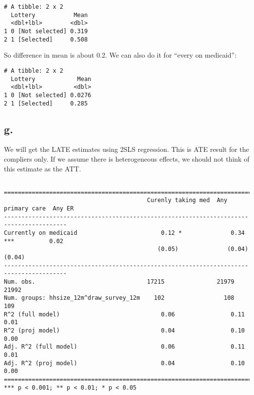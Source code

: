 \documentclass[
  letterpaper,
  DIV=11,
  numbers=noendperiod]{scrartcl}
\begin{document}
\begin{verbatim}
# A tibble: 2 x 2
  Lottery           Mean
  <dbl+lbl>        <dbl>
1 0 [Not selected] 0.319
2 1 [Selected]     0.508
\end{verbatim}

So difference in mean is about 0.2. We can also do it for ``every on
medicaid'':

\begin{verbatim}
# A tibble: 2 x 2
  Lottery            Mean
  <dbl+lbl>         <dbl>
1 0 [Not selected] 0.0276
2 1 [Selected]     0.285 
\end{verbatim}

\subsection{g.}\label{g.}

We will get the LATE estimates using 2SLS regression. This is ATE result
for the compliers only. If we assume there is heterogeneous effects, we
should not think of this estimate as the ATT.

\begin{verbatim}

========================================================================================
                                         Curenly taking med  Any primary care  Any ER   
----------------------------------------------------------------------------------------
Currently on medicaid                        0.12 *              0.34 ***          0.02 
                                            (0.05)              (0.04)            (0.04)
----------------------------------------------------------------------------------------
Num. obs.                                17215               21979             21992    
Num. groups: hhsize_12m^draw_survey_12m    102                 108               109    
R^2 (full model)                             0.06                0.11              0.01 
R^2 (proj model)                             0.04                0.10              0.00 
Adj. R^2 (full model)                        0.06                0.11              0.01 
Adj. R^2 (proj model)                        0.04                0.10              0.00 
========================================================================================
*** p < 0.001; ** p < 0.01; * p < 0.05
\end{verbatim}
\end{document}
